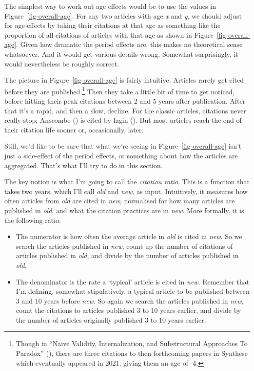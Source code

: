 \documentclass[
  12pt,
  letterpaper,
  DIV=11,
  numbers=noendperiod]{scrartcl}
\providecommand{\tightlist}{%
  \setlength{\itemsep}{0pt}\setlength{\parskip}{0pt}}
\begin{document}
The simplest way to work out age effects would be to use the values in
Figure~\ref{fig-overall-age}. For any two articles with age \emph{x} and
\emph{y}, we should adjust for age-effects by taking their citations at
that age as something like the proportion of all citations of articles
with that age as shown in Figure~\ref{fig-overall-age}. Given how
dramatic the period effects are, this makes no theoretical sense
whatsoever. And it would get various details wrong. Somewhat
surprisingly, it would nevertheless be roughly correct.

The picture in Figure~\ref{fig-overall-age} is fairly intuitive.
Articles rarely get cited before they are published.\footnote{Though in
  ``Naive Validity, Internalization, and Substructural Approaches To
  Paradox'' (), there
  are three citations to then forthcoming papers in Synthese which
  eventually appeared in 2021, giving them an age of -4.} Then they take
a little bit of time to get noticed, before hitting their peak citations
between 2 and 5 years after publication. After that it's a rapid, and
then a slow, decline. For the classic articles, citations never really
stop; Anscombe () is cited by
Izgin (). But most articles reach
the end of their citation life sooner or, occasionally, later.

Still, we'd like to be sure that what we're seeing in
Figure~\ref{fig-overall-age} isn't just a side-effect of the period
effects, or something about how the articles are aggregated. That's what
I'll try to do in this section.

The key notion is what I'm going to call the \emph{citation ratio}. This
is a function that takes two years, which I'll call \emph{old} and
\emph{new}, as input. Intuitively, it measures how often articles from
\emph{old} are cited in \emph{new}, normalised for how many articles are
published in \emph{old}, and what the citation practices are in
\emph{new}. More formally, it is the following ratio:

\begin{itemize}
\tightlist
\item
  The numerator is how often the average article in \emph{old} is cited
  in \emph{new}. So we search the articles published in \emph{new},
  count up the number of citations of articles published in \emph{old},
  and divide by the number of articles published in \emph{old}.
\item
  The denominator is the rate a `typical' article is cited in
  \emph{new}. Remember that I'm defining, somewhat stipulatively, a
  typical article to be published between 3 and 10 years before
  \emph{new}. So again we search the articles published in \emph{new},
  count the citations to articles published 3 to 10 years earlier, and
  divide by the number of articles originally published 3 to 10 years
  earlier.
\end{itemize}
\end{document}
